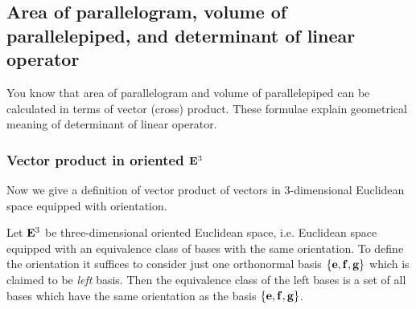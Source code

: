 \documentclass[12pt]{article}
\numberwithin{equation}{section}
\begin{document}

  \subsection{ Area of parallelogram, volume of parallelepiped,
and determinant of linear operator}

You know that area of parallelogram and volume of parallelepiped
can be calculated in terms of vector (cross) product.
 These formulae explain geometrical meaning of  determinant
 of linear operator.  


    \subsubsection {Vector product in oriented ${\bf E}^3$}

 

Now we give a definition of vector product of vectors in $3$-dimensional
Euclidean space equipped with orientation.

\m

 Let ${\bf E}^3$ be three-dimensional oriented Euclidean space, i.e. Euclidean space equipped with an equivalence class
 of bases with the same orientation. To define the orientation it suffices to consider just one
 orthonormal basis
 $\{{\bf e},{\bf f},{\bf g}\}$ which is claimed to be {\it left} basis. 
Then the equivalence class of the left bases is a
 set of all bases which have the same orientation as the basis $\{{\bf e},{\bf f},{\bf g}\}$.
\end{document}
